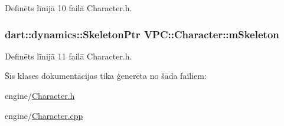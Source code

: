 Definēts līnijā 10 failā Character.\+h.

\subsubsection[{\texorpdfstring{m\+Skeleton}{mSkeleton}}]{\setlength{\rightskip}{0pt plus 5cm}dart\+::dynamics\+::\+Skeleton\+Ptr V\+P\+C\+::\+Character\+::m\+Skeleton\hspace{0.3cm}{\ttfamily [private]}}\hypertarget{class_v_p_c_1_1_character_afbd0d7d0c6227cabd47de1a5c2d7c039}{}\label{class_v_p_c_1_1_character_afbd0d7d0c6227cabd47de1a5c2d7c039}


Definēts līnijā 11 failā Character.\+h.



Šīs klases dokumentācijas tika ģenerēta no šāda failiem\+:\begin{DoxyCompactItemize}
\item 
engine/\hyperlink{_character_8h}{Character.\+h}\item 
engine/\hyperlink{_character_8cpp}{Character.\+cpp}\end{DoxyCompactItemize}
